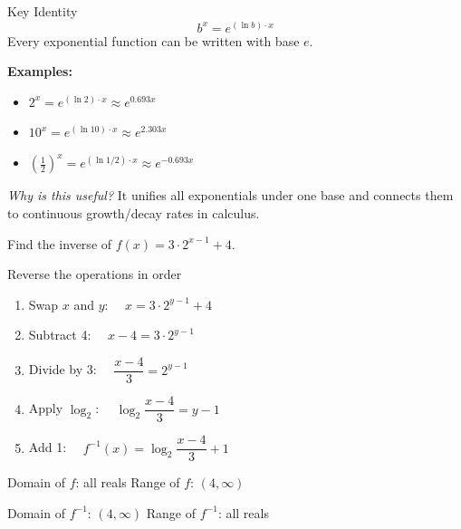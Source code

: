 \documentclass[aspectratio=169, 11pt]{beamer}
\begin{document}
\begin{frame}[t, plain]

  \vspace{0.3cm}
  \begin{block}{Key Identity}
    \[
      b^x = e^{(\ln b)\cdot x}
    \]
    Every exponential function can be written with base $e$.
  \end{block}

  \vspace{0.3cm}
  \textbf{Examples:}
  \setlength{\itemsep}{8pt}
  \begin{itemize}
    \item $2^x = e^{(\ln 2)\cdot x} \approx e^{0.693x}$
    \item $10^x = e^{(\ln 10)\cdot x} \approx e^{2.303x}$
    \item $\left(\tfrac{1}{2}\right)^x = e^{(\ln 1/2)\cdot x} \approx e^{-0.693x}$
  \end{itemize}

  \vspace{0.3cm}
  \textit{Why is this useful?} It unifies all exponentials under one base and connects
  them to continuous growth/decay rates in calculus.
\end{frame}

\begin{frame}[t, plain]

  \vspace{0.2cm}
  Find the inverse of $f(x) = 3\cdot2^{x-1}+4$.

  \vspace{0.2cm}
  \begin{block}{Reverse the operations in order}
    \setlength{\itemsep}{4pt}
    \begin{enumerate}
      \item Swap $x$ and $y$: $\quad x = 3\cdot2^{y-1}+4$
      \item Subtract 4: $\quad x-4 = 3\cdot2^{y-1}$
      \item Divide by 3: $\quad \dfrac{x-4}{3} = 2^{y-1}$
      \item Apply $\log_2$: $\quad \log_2\!\dfrac{x-4}{3} = y-1$
      \item Add 1: $\quad f^{-1}(x) = \log_2\!\dfrac{x-4}{3} + 1$
    \end{enumerate}
  \end{block}

  \vspace{0.2cm}
  Domain of $f$: all reals \quad Range of $f$: $(4, \infty)$

  \vspace{0.1cm}
  Domain of $f^{-1}$: $(4, \infty)$ \quad Range of $f^{-1}$: all reals
\end{frame}
\end{document}
